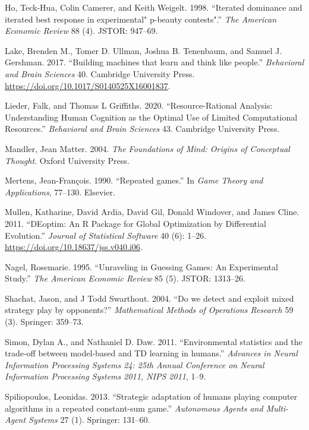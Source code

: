 \documentclass[smallextended]{svjour3}       %
\begin{document}
\leavevmode\hypertarget{ref-ho1998iterated}{}%
Ho, Teck-Hua, Colin Camerer, and Keith Weigelt. 1998. ``Iterated
dominance and iterated best response in experimental" p-beauty
contests".'' \emph{The American Economic Review} 88 (4). JSTOR: 947--69.

\leavevmode\hypertarget{ref-Lake2017}{}%
Lake, Brenden M., Tomer D. Ullman, Joshua B. Tenenbaum, and Samuel J.
Gershman. 2017. ``Building machines that learn and think like people.''
\emph{Behavioral and Brain Sciences} 40. Cambridge University Press.
\url{https://doi.org/10.1017/S0140525X16001837}.

\leavevmode\hypertarget{ref-lieder2020resource}{}%
Lieder, Falk, and Thomas L Griffiths. 2020. ``Resource-Rational
Analysis: Understanding Human Cognition as the Optimal Use of Limited
Computational Resources.'' \emph{Behavioral and Brain Sciences} 43.
Cambridge University Press.

\leavevmode\hypertarget{ref-mandler2004foundations}{}%
Mandler, Jean Matter. 2004. \emph{The Foundations of Mind: Origins of
Conceptual Thought}. Oxford University Press.

\leavevmode\hypertarget{ref-mertens1990repeated}{}%
Mertens, Jean-François. 1990. ``Repeated games.'' In \emph{Game Theory
and Applications}, 77--130. Elsevier.

\leavevmode\hypertarget{ref-R-DEoptim}{}%
Mullen, Katharine, David Ardia, David Gil, Donald Windover, and James
Cline. 2011. ``DEoptim: An R Package for Global Optimization by
Differential Evolution.'' \emph{Journal of Statistical Software} 40 (6):
1--26. \url{https://doi.org/10.18637/jss.v040.i06}.

\leavevmode\hypertarget{ref-nagel1995unraveling}{}%
Nagel, Rosemarie. 1995. ``Unraveling in Guessing Games: An Experimental
Study.'' \emph{The American Economic Review} 85 (5). JSTOR: 1313--26.

\leavevmode\hypertarget{ref-shachat2004we}{}%
Shachat, Jason, and J Todd Swarthout. 2004. ``Do we detect and exploit
mixed strategy play by opponents?'' \emph{Mathematical Methods of
Operations Research} 59 (3). Springer: 359--73.

\leavevmode\hypertarget{ref-Simon_Daw_11}{}%
Simon, Dylan A., and Nathaniel D. Daw. 2011. ``Environmental statistics
and the trade-off between model-based and TD learning in humans.''
\emph{Advances in Neural Information Processing Systems 24: 25th Annual
Conference on Neural Information Processing Systems 2011, NIPS 2011},
1--9.

\leavevmode\hypertarget{ref-spiliopoulos2013strategic}{}%
Spiliopoulos, Leonidas. 2013. ``Strategic adaptation of humans playing
computer algorithms in a repeated constant-sum game.'' \emph{Autonomous
Agents and Multi-Agent Systems} 27 (1). Springer: 131--60.
\end{document}
